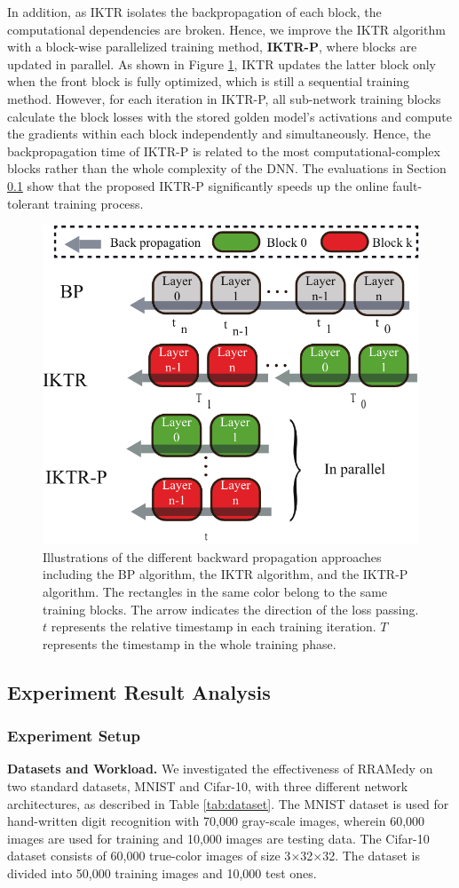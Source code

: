 In addition, as IKTR isolates the backpropagation of each block, the computational dependencies are broken. Hence, we improve the IKTR algorithm with a block-wise parallelized training method, {\bf IKTR-P}, where blocks are updated in parallel. As shown in Figure \ref{fig:paralleltraining}, IKTR updates the latter block only when the front block is fully optimized, which is still a sequential training method. However, for each iteration in IKTR-P, all sub-network training blocks calculate the block losses with the stored golden model's activations and compute the gradients within each block independently and simultaneously. Hence, the backpropagation time of IKTR-P is related to the most computational-complex blocks rather than the whole complexity of the DNN. The evaluations in Section \ref{Evaluations} show that the proposed IKTR-P significantly speeds up the online fault-tolerant training process.

\begin{figure}
    \centering
    \includegraphics[width=0.55\linewidth]{images/OL-fig9}
    \caption{Illustrations of the different backward propagation approaches including the BP algorithm, the IKTR algorithm, and the IKTR-P algorithm. The rectangles in the same color belong to the same training blocks. The arrow indicates the direction of the loss passing. $t$ represents the relative timestamp in each training iteration. $T$ represents the timestamp in the whole training phase.}
    \label{fig:paralleltraining} 
    \vspace{-10pt}
\end{figure}

\subsection{Experiment Result Analysis}\label{Evaluations}
\subsubsection{Experiment Setup}
{\bf Datasets and Workload.} 
We investigated the effectiveness of RRAMedy on two standard datasets, MNIST and Cifar-10, with three different network architectures, as described in Table \ref{tab:dataset}. The MNIST dataset is used for hand-written digit recognition with 70,000 gray-scale images, wherein 60,000 images are used for training and 10,000 images are testing data. The Cifar-10 dataset consists of 60,000 true-color images of size 3$\times$32$\times$32. The dataset is divided into 50,000 training images and 10,000 test ones. 

